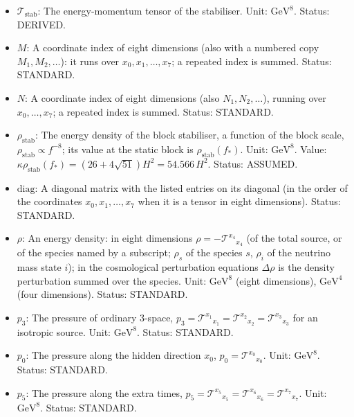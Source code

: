 \documentclass[
  10pt,
]{article}
\providecommand{\tightlist}{%
  \setlength{\itemsep}{0pt}\setlength{\parskip}{0pt}}
\begin{document}
\begin{itemize}
\tightlist
\item
  \(\mathcal{T}_{\mathrm{stab}}\): The energy-momentum tensor of the
  stabiliser. Unit: \(\mathrm{GeV}^{8}\). Status: DERIVED.
\item
  \(M\): A coordinate index of eight dimensions (also with a numbered
  copy \(M_1, M_2, \dots\)): it runs over \(x_0, x_1, \dots, x_7\); a
  repeated index is summed. Status: STANDARD.
\item
  \(N\): A coordinate index of eight dimensions (also
  \(N_1, N_2, \dots\)), running over \(x_0, \dots, x_7\); a repeated
  index is summed. Status: STANDARD.
\item
  \(\rho_{\mathrm{stab}}\): The energy density of the block stabiliser,
  a function of the block scale,
  \(\rho_{\mathrm{stab}} \propto f^{-8}\); its value at the static block
  is \(\rho_{\mathrm{stab}}(f_*)\). Unit: \(\mathrm{GeV}^{8}\). Value:
  \(\kappa\rho_{\mathrm{stab}}(f_*) = (26 + 4\sqrt{51})H^2 = 54.566\,H^2\).
  Status: ASSUMED.
\item
  \(\mathrm{diag}\): A diagonal matrix with the listed entries on its
  diagonal (in the order of the coordinates \(x_0, x_1, \dots, x_7\)
  when it is a tensor in eight dimensions). Status: STANDARD.
\item
  \(\rho\): An energy density: in eight dimensions
  \(\rho = -\mathcal{T}^{x_4}{}_{x_4}\) (of the total source, or of the
  species named by a subscript; \(\rho_s\) of the species \(s\),
  \(\rho_i\) of the neutrino mass state \(i\)); in the cosmological
  perturbation equations \(\Delta\rho\) is the density perturbation
  summed over the species. Unit: \(\mathrm{GeV}^{8}\) (eight
  dimensions), \(\mathrm{GeV}^{4}\) (four dimensions). Status: STANDARD.
\item
  \(p_3\): The pressure of ordinary 3-space,
  \(p_3 = \mathcal{T}^{x_1}{}_{x_1} = \mathcal{T}^{x_2}{}_{x_2} = \mathcal{T}^{x_3}{}_{x_3}\)
  for an isotropic source. Unit: \(\mathrm{GeV}^{8}\). Status: STANDARD.
\item
  \(p_0\): The pressure along the hidden direction \(x_0\),
  \(p_0 = \mathcal{T}^{x_0}{}_{x_0}\). Unit: \(\mathrm{GeV}^{8}\).
  Status: STANDARD.
\item
  \(p_5\): The pressure along the extra times,
  \(p_5 = \mathcal{T}^{x_5}{}_{x_5} = \mathcal{T}^{x_6}{}_{x_6} = \mathcal{T}^{x_7}{}_{x_7}\).
  Unit: \(\mathrm{GeV}^{8}\). Status: STANDARD.
\end{itemize}
\end{document}
